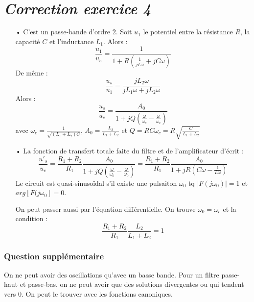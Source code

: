 \documentclass{report}
\begin{document}
\newpage

\section*{\textit{Correction exercice 4}}

\begin{itemize}
	\item[•] C'est un passe-bande d'ordre 2. Soit $u_1$ le potentiel entre la résistance $R$, la capacité $C$ et l'inductance $L_1$. Alors :
	\begin{equation}
		\frac{u_1}{u_e}=\frac{1}{1+R\left(\frac{1}{jL\omega}+ jC\omega \right) }
	\end{equation}
	De même :
	\begin{equation}
		\frac{u_s}{u_1}=\frac{jL_2\omega}{jL_1\omega+jL_2\omega}
	\end{equation}
	Alors : 
	\begin{equation}
		\frac{u_s}{u_e}=\frac{A_0}{1+jQ\left( \frac{\omega}{\omega_c}- \frac{\omega}{\omega_c}\right)}
	\end{equation}
	avec $\omega_c=\frac{1}{\sqrt{(L_1+L_2)C}}$, $A_0=\frac{L_2}{L_1+L_2}$ et $Q=RC\omega_c=R\sqrt{\frac{C}{L_1+L_2}}$
	
	\item[•] La fonction de transfert totale faite du filtre et de l'amplificateur d'écrit : 
		\begin{equation}
		\frac{u'_s}{u_e}=\frac{R_1+R_2}{R_1}\frac{A_0}{1+jQ\left( \frac{\omega}{\omega_0}- \frac{\omega}{\omega_0}\right)}=\frac{R_1+R_2}{R_1}\frac{A_0}{1+jR\left(C\omega- \frac{1}{L\omega}\right)}
	\end{equation}
	Le circuit est quasi-sinusoïdal s'il existe une pulsaiton $\omega_0$ tq $\mid F(j\omega_0)\mid=1$ et $arg\left[F(j\omega_0 \right] =0 $.
	
	On peut passer aussi par l'équation différentielle.
	On trouve $\omega_0=\omega_c$ et la condition :
	\begin{equation}
		\frac{R_1+R_2}{R_1}\frac{L_2}{L_1+L_2}=1
	\end{equation}
\end{itemize}

\subsubsection{Question supplémentaire}

On ne peut avoir des oscillations qu'avec un basse bande. Pour un filtre passe-haut et passe-bas, on ne peut avoir que des solutions divergentes ou qui tendent vers 0. On peut le trouver avec les fonctions canoniques.
\end{document}
